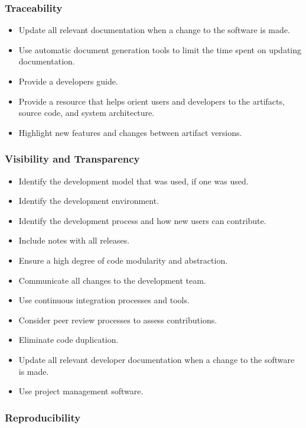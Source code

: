 \documentclass[12pt, notitlepage]{article}
\begin{document}
\subsubsection{Traceability}

\begin{itemize}
	\item Update all relevant documentation when a change to the software is made.
	\item Use automatic document generation tools to limit the time spent on updating documentation.
	\item Provide a developers guide.
	\item Provide a resource that helps orient users and developers to the artifacts, source code, and system architecture.
	\item Highlight new features and changes between artifact versions. 
\end{itemize}

\subsubsection{Visibility and Transparency}

\begin{itemize}
	\item Identify the development model that was used, if one was used.
	\item Identify the development environment.
	\item Identify the development process and how new users can contribute. 
	\item Include notes with all releases.
	\item Ensure a high degree of code modularity and abstraction.
	\item Communicate all changes to the development team.
	\item Use continuous integration processes and tools.
	\item Consider peer review processes to assess contributions. 
	\item Eliminate code duplication.
	\item Update all relevant developer documentation when a change to the software is made.
	\item Use project management software.
\end{itemize}

\subsubsection{Reproducibility}
\end{document}
